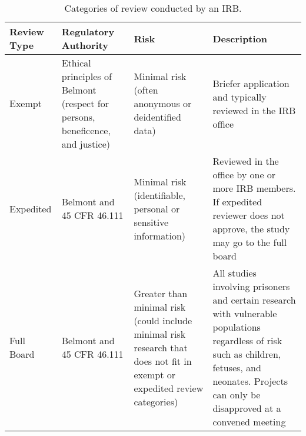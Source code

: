 \begin{table}

\caption{\label{tab:}Categories of review conducted by an IRB.}
\centering
\begin{tabular}[t]{l|l|l|l}
\hline
Review Type & Regulatory Authority & Risk & Description\\
\hline
Exempt & Ethical principles of Belmont (respect for persons, beneficence, and justice) & Minimal risk (often anonymous or deidentified data) & Briefer application and typically reviewed in the IRB office\\
\hline
Expedited & Belmont and 45 CFR 46.111 & Minimal risk (identifiable, personal or sensitive information) & Reviewed in the office by one or more IRB members. If expedited reviewer does not approve, the study may go to the full board\\
\hline
Full Board & Belmont and 45 CFR 46.111 & Greater than minimal risk (could include minimal risk research that does not fit in exempt or expedited review categories) & All studies involving prisoners and certain research with vulnerable populations regardless of risk such as children, fetuses, and neonates. Projects can only be disapproved at a convened meeting\\
\hline
\end{tabular}
\end{table}